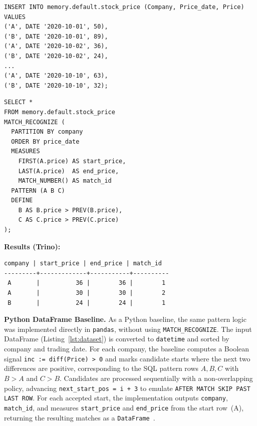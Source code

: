 \begin{lstlisting}[basicstyle=\ttfamily\small,
  backgroundcolor=\color{gray!10},
  caption={[Insert rows in Trino]Inserting data into the table.}]
INSERT INTO memory.default.stock_price (Company, Price_date, Price) VALUES
('A', DATE '2020-10-01', 50),
('B', DATE '2020-10-01', 89),
('A', DATE '2020-10-02', 36),
('B', DATE '2020-10-02', 24),
...
('A', DATE '2020-10-10', 63),
('B', DATE '2020-10-10', 32);
\end{lstlisting}

\begin{lstlisting}[basicstyle=\ttfamily\small,
  backgroundcolor=\color{gray!10},
  caption={[Execute MATCH\_RECOGNIZE in Trino]Executing the same \texttt{MATCH\_RECOGNIZE} query in Trino.}]
SELECT *
FROM memory.default.stock_price
MATCH_RECOGNIZE (
  PARTITION BY company
  ORDER BY price_date
  MEASURES
    FIRST(A.price) AS start_price,
    LAST(A.price)  AS end_price,
    MATCH_NUMBER() AS match_id
  PATTERN (A B C)
  DEFINE
    B AS B.price > PREV(B.price),
    C AS C.price > PREV(C.price)
);
\end{lstlisting}

\noindent\textbf{Results (Trino):}
\begin{lstlisting}[basicstyle=\ttfamily\small, backgroundcolor=\color{gray!10}]
 company | start_price | end_price | match_id
---------+-------------+-----------+----------
 A       |          36 |        36 |        1
 A       |          30 |        30 |        2
 B       |          24 |        24 |        1
\end{lstlisting}

\noindent\textbf{Python DataFrame Baseline.}
As a Python baseline, the same pattern logic was implemented directly in
\texttt{pandas}, without using \texttt{MATCH\_RECOGNIZE}.  The input
DataFrame (Listing~\ref{lst:dataset}) is converted to \texttt{datetime}
and sorted by company and trading date.  For each company, the
baseline computes a Boolean signal
\texttt{inc\,:=\,diff(Price)\,>\,0} and marks candidate
starts where the next two differences are positive, corresponding to
the SQL pattern rows $A,B,C$ with $B>A$ and $C>B$.  Candidates are
processed sequentially with a
non-overlapping policy, advancing
\texttt{next\_start\_pos\,=\,i\,+\,3} to emulate
\texttt{AFTER MATCH SKIP PAST LAST ROW}.  For each accepted start, the
implementation outputs \texttt{company}, \texttt{match\_id}, and
measures \texttt{start\_price} and \texttt{end\_price} from the start
row~(A), returning the resulting matches as a
\texttt{DataFrame}~\cite{Python_UDF}.

